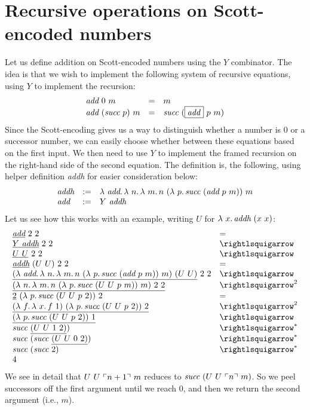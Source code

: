 \section{Recursive operations on Scott-encoded numbers}

Let us define addition on Scott-encoded numbers using the $Y$ combinator.  The idea is that we wish to implement the following
system of recursive equations, using $Y$ to implement the recursion:
\[
\begin{array}{lll}
  \textit{add}\ 0\ m & = & m \\
  \textit{add}\ (\textit{succ}\ p)\ m & = & \textit{succ}\ (\fbox{\textit{add}}\ p\ m)
\end{array}
\]
\noindent Since the Scott-encoding gives us a way to distinguish whether a number is $0$ or a successor number, we can
easily choose whether between these equations based on the first input.  We then need to use $Y$ to implement the framed
recursion on the right-hand side of the second equation.  The definition is, the following, using helper definition \textit{addh} for
easier consideration below:
\[
\begin{array}{lll}
  \textit{addh} & := & \lam{\textit{add}}{\lam{n}{\lam{m}{n\ (\lam{p}{\textit{succ}\ (\textit{add}\ p\ m)})\ m}}} \\
  \textit{add} & := & Y\ \textit{addh}
  \end{array}
\]
\noindent Let us see how this works with an example, writing $U$ for $\lambda\ x.\, \textit{addh}\ (x\ x)$:
\[
\begin{array}{ll}
  \underline{\textit{add}}\ 2\ 2 & = \\
  \underline{Y\ \textit{addh}}\ 2\ 2 & \betaa \\
  \underline{U\ U}\ 2\ 2 & \betaa \\  
  \underline{\textit{addh}}\ (U\ U)\ 2\ 2 & = \\
  \underline{(\lam{\textit{add}}{\lam{n}{\lam{m}{n\ (\lam{p}{\textit{succ}\ (\textit{add}\ p\ m)})\ m}}})\ (U\ U)}\ 2\ 2 & \betaa \\  
  \underline{(\lam{n}{\lam{m}{n\ (\lam{p}{\textit{succ}\ (U\ U\ p\ m)})\ m}})\ 2\ 2} & \betaa^2 \\
  \underline{2}\ (\lam{p}{\textit{succ}\ (U\ U\ p\ 2)})\ 2 & = \\
  \underline{(\lam{f}{\lam{x}{f\ 1}})\ (\lam{p}{\textit{succ}\ (U\ U\ p\ 2)})\ 2} & \betaa^2 \\
  \underline{(\lam{p}{\textit{succ}\ (U\ U\ p\ 2)})\ 1} & \betaa \\
  \textit{succ}\ \underline{(U\ U\ 1\ 2)}) & \betaa^* \\
  \textit{succ}\ (\textit{succ}\ \underline{(U\ U\ 0\ 2)}) & \betaa^* \\
  \textit{succ}\ (\textit{succ}\ 2) & \betaa^* \\
  4 &\ 
  \end{array}
\]
\noindent We see in detail that $U\ U\ \ulcorner n+1 \urcorner\ m$ reduces to
$\textit{succ}\ (U\ U\ \ulcorner n \urcorner\ m)$.  So we peel successors off the
first argument until we reach $0$, and then we return the second
argument (i.e., $m$).

